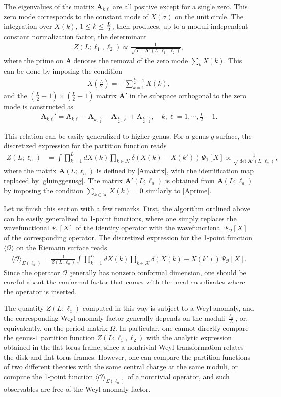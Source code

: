 \documentclass[12pt]{article}
\def\ie{\begin{equation}\begin{aligned}}
\def\fe{\end{aligned}\end{equation}}
\numberwithin{equation}{section}
\begin{document}
The eigenvalues of the matrix $\mathbf{A}_{k\ell}$ are all positive except for a single zero. This zero mode corresponds to the constant mode of $X(\sigma)$ on the unit circle. The integration over $X(k)$, $1\leq k\leq {L\over 2}$, then produces, up to a moduli-independent constant normalization factor, the determinant
\ie\label{detprime}
Z(L;\ell_1, \ell_2) \propto \frac{1}{\sqrt{\det \mathbf{A}'(L;\ell_1, \ell_2)}},
\fe
where the prime on $\mathbf{A}$ denotes the removal of the zero mode $\sum_k X(k)$. This can be done by imposing the condition
\ie X(\tfrac{L}{2})=-\sum_{k=1}^{\tfrac{L}{2}-1}X(k),
\fe 
and the $(\tfrac{L}{2}-1)\times (\tfrac{L}{2}-1)$ matrix $\mathbf{A}'$ in the subspace orthogonal to the zero mode is constructed as
\ie\label{Aprime}
\mathbf{A}_{k\ell}'= \mathbf{A}_{k\ell}-\mathbf{A}_{k,\frac{L}{2}}-\mathbf{A}_{\frac{L}{2},\ell}+\mathbf{A}_{\frac{L}{2}, \frac{L}{2}},\quad k,\ell = 1,\cdots, \tfrac{L}{2}-1.
\fe

This relation can be easily generalized to higher genus. For a genus-$g$ surface, the discretized expression for the partition function reads
\ie \label{detprimeg}
Z(L;\ell_a) &=\int \prod_{k=1}^{L} dX(k)\prod_{k\in \mathcal{K}} \delta(X(k)-X(k'))\,\Psi_1[X]\propto \frac{1}{\sqrt{\det \mathbf{A}'(L;\ell_a)}},
\fe
where the matrix $\mathbf{A}(L;\ell_a)$ is defined by \eqref{Amatrix}, with the identification map replaced by \eqref{gluinggenusg}. The matrix $\mathbf{A}'(L;\ell_a)$ is obtained from $\mathbf{A}(L;\ell_a)$ by imposing the condition $\sum_{k\in\mathcal{K}}X(k)=0$ similarly to \eqref{Aprime}.

Let us finish this section with a few remarks. First, the algorithm outlined above can be easily generalized to 1-point functions, where one simply replaces the wavefunctional $\Psi_1[X]$ of the identity operator with the wavefunctional $\Psi_\mathcal{O}[X]$ of the corresponding operator. The discretized expression for the 1-point function $\langle \mathcal{O}\rangle$ on the Riemann surface reads
\ie
\langle \mathcal{O}\rangle_{\Sigma(\ell_a)}= \frac{1}{Z(L;\ell_a)}\int \prod_{k=1}^{L} dX(k)\prod_{k\in \mathcal{K}} \delta(X(k)-X(k'))\,\Psi_\mathcal{O}[X].
\fe
Since the operator $\mathcal{O}$ generally has nonzero conformal dimension, one should be careful about the conformal factor that comes with the local coordinates where the operator is inserted.

The quantity $Z(L;\ell_a)$ computed in this way is subject to a Weyl anomaly, and the corresponding Weyl-anomaly factor generally depends on the moduli $\frac{\ell_a}{L}$, or, equivalently, on the period matrix $\Omega$. In particular, one cannot directly compare the genus-$1$ partition function $Z(L;\ell_1, \ell_2)$ with the analytic expression obtained in the flat-torus frame, since a nontrivial Weyl transformation relates the disk and flat-torus frames. However, one can compare the partition functions of two different theories with the same central charge at the same moduli, or compute the 1-point function $\langle \mathcal{O}\rangle_{\Sigma(\ell_a)}$ of a nontrivial operator, and such observables are free of the Weyl-anomaly factor.
\end{document}
